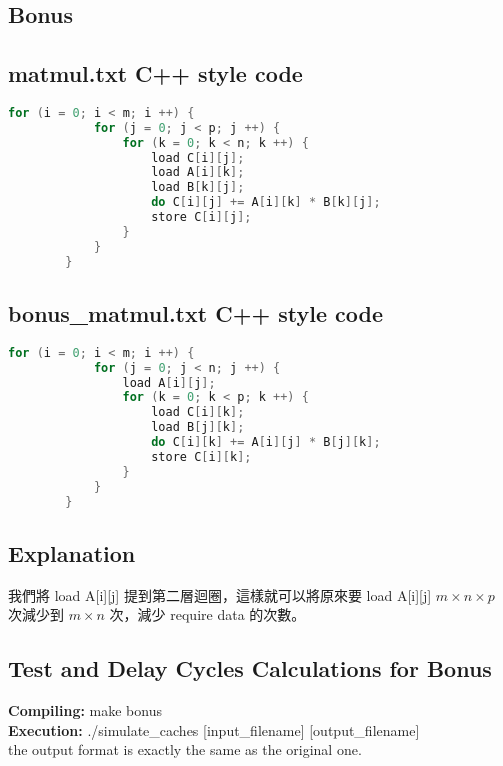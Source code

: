 \documentclass[12pt, a4paper]{article}
\begin{document}
\begin{CJK*}{UTF8}{bsmi}
    \section{Bonus}
        \subsection{matmul.txt C++ style code}
        \begin{lstlisting}[language=C++]
        for (i = 0; i < m; i ++) {
            for (j = 0; j < p; j ++) {
                for (k = 0; k < n; k ++) {
                    load C[i][j];
                    load A[i][k];
                    load B[k][j];
                    do C[i][j] += A[i][k] * B[k][j];
                    store C[i][j];
                }
            }
        }
        \end{lstlisting}

        \newpage

        \subsection{bonus\_matmul.txt C++ style code}
        \begin{lstlisting}[language=C++]
        for (i = 0; i < m; i ++) {
            for (j = 0; j < n; j ++) {
                load A[i][j];
                for (k = 0; k < p; k ++) {
                    load C[i][k];
                    load B[j][k];
                    do C[i][k] += A[i][j] * B[j][k];
                    store C[i][k];
                }
            }
        }
        \end{lstlisting}

        \subsection{Explanation}
            我們將 load A[i][j] 提到第二層迴圈，這樣就可以將原來要 load A[i][j] $m \times n \times p$ 次減少到 $m \times n$ 次，減少 require data 的次數。
        \subsection{Test and Delay Cycles Calculations for Bonus}
            \textbf{Compiling:} make bonus \\
            \textbf{Execution:} ./simulate\_caches [input\_filename] [output\_filename] \\
            the output format is exactly the same as the original one. \\


\end{CJK*}
\end{document}
